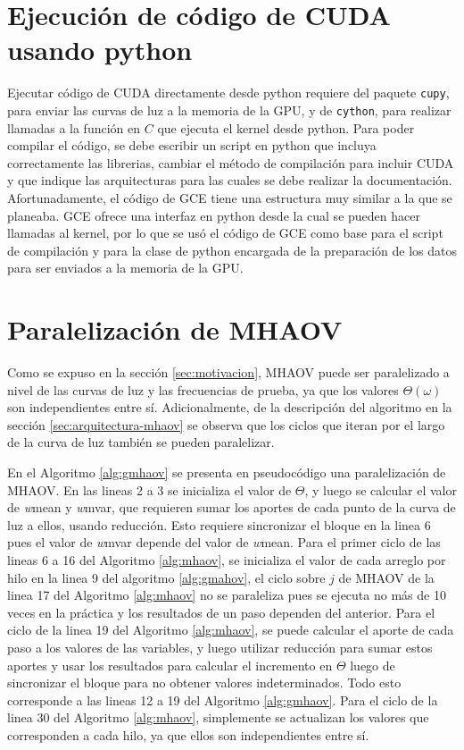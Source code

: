 \section{Ejecución de código de CUDA usando python}\label{sec:python-cuda}
Ejecutar código de CUDA directamente desde python requiere del paquete \texttt{cupy}, para enviar las curvas de luz a la memoria de la GPU, y de \texttt{cython}, para realizar llamadas a la función en $C$ que ejecuta el kernel desde python. Para poder compilar el código, se debe escribir un script en python que incluya correctamente las librerias, cambiar el método de compilación para incluir CUDA y que indique las arquitecturas para las cuales se debe realizar la documentación. Afortunadamente, el código de GCE tiene una estructura muy similar a la que se planeaba. GCE ofrece una interfaz en python desde la cual se pueden hacer llamadas al kernel, por lo que se usó el código de GCE como base para el script de compilación y para la clase de python encargada de la preparación de los datos para ser enviados a la memoria de la GPU.

\section{Paralelización de MHAOV}\label{sec:paralelización}
Como se expuso en la sección \ref{sec:motivacion}, MHAOV puede ser paralelizado a nivel de las curvas de luz y las frecuencias de prueba, ya que los valores $\Theta(\omega)$ son independientes entre sí. Adicionalmente, de la descripción del algoritmo en la sección \ref{sec:arquitectura-mhaov} se observa que los ciclos que iteran por el largo de la curva de luz también se pueden paralelizar.

En el Algoritmo \ref{alg:gmhaov} se presenta en pseudocódigo una paralelización de MHAOV. En las lineas 2 a 3 se inicializa el valor de $\Theta$, y luego se calcular el valor de {\textit wmean} y {\textit wmvar}, que requieren sumar los aportes de cada punto de la curva de luz a ellos, usando reducción. Esto requiere sincronizar el bloque en la linea 6 pues el valor de {\textit wmvar} depende del valor de {\textit wmean}. Para el primer ciclo de las lineas 6 a 16 del Algoritmo \ref{alg:mhaov}, se inicializa el valor de cada arreglo por hilo en la linea 9 del algoritmo \ref{alg:gmahov}, el ciclo sobre $j$ de MHAOV de la linea 17 del Algoritmo \ref{alg:mhaov} no se paraleliza pues se ejecuta no más de 10 veces en la práctica y los resultados de un paso dependen del anterior. Para el ciclo de la linea 19 del Algoritmo \ref{alg:mhaov}, se puede calcular el aporte de cada paso a los valores de las variables, y luego utilizar reducción para sumar estos aportes y usar los resultados para calcular el incremento en $\Theta$ luego de sincronizar el bloque para no obtener valores indeterminados. Todo esto corresponde a las lineas 12 a 19 del Algoritmo \ref{alg:gmhaov}. Para el ciclo de la linea 30 del Algoritmo \ref{alg:mhaov}, simplemente se actualizan los valores que corresponden a cada hilo, ya que ellos son independientes entre sí.

